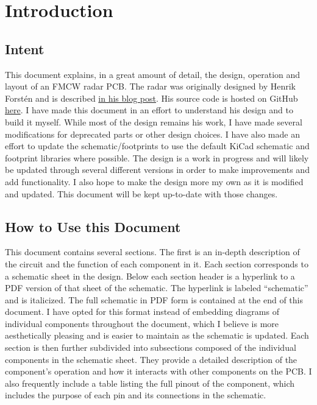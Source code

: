 \documentclass{default}
\begin{document}
\tableofcontents
\hypersetup{linkcolor=red}

\chapter{Introduction}
\label{cha:introduction}

\section{Intent}
\label{sec:intent}

This document explains, in a great amount of detail, the design, operation and layout of an FMCW
radar PCB. The radar was originally designed by Henrik Forst\'en and is described
\href{http://hforsten.com/third-version-of-homemade-6-ghz-fmcw-radar.html}{in his blog post}. His
source code is hosted on GitHub \href{https://github.com/Ttl/fmcw3}{here}. I have made this document
in an effort to understand his design and to build it myself. While most of the design remains his
work, I have made several modifications for deprecated parts or other design choices. I have also
made an effort to update the schematic/footprints to use the default KiCad schematic and footprint
libraries where possible. The design is a work in progress and will likely be updated through
several different versions in order to make improvements and add functionality. I also hope to make
the design more my own as it is modified and updated. This document will be kept up-to-date with
those changes.

\section{How to Use this Document}
\label{sec:how-to-use}

This document contains several sections. The first is an in-depth description of the circuit and the
function of each component in it. Each section corresponds to a schematic sheet in the design. Below
each section header is a hyperlink to a PDF version of that sheet of the schematic. The hyperlink is
labeled ``schematic'' and is italicized. The full schematic in PDF form is contained at the end of
this document. I have opted for this format instead of embedding diagrams of individual components
throughout the document, which I believe is more aesthetically pleasing and is easier to maintain as
the schematic is updated. Each section is then further subdivided into subsections composed of the
individual components in the schematic sheet. They provide a detailed description of the component's
operation and how it interacts with other components on the PCB. I also frequently include a table
listing the full pinout of the component, which includes the purpose of each pin and its connections
in the schematic.
\end{document}
